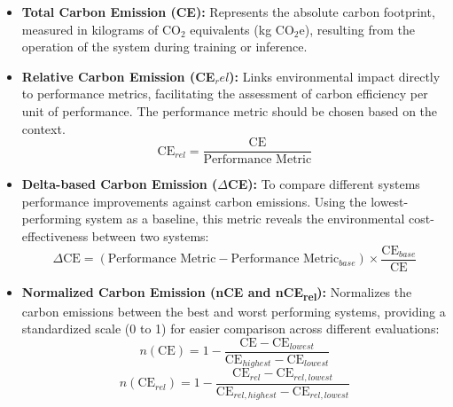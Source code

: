 \begin{itemize}
    \item \textbf{Total Carbon Emission (CE):} Represents the absolute carbon footprint, measured in kilograms of CO$_2$ equivalents (kg CO$_2$e), resulting from the operation of the system during training or inference.

    \item \textbf{Relative Carbon Emission (CE$_rel$):} Links environmental impact directly to performance metrics, facilitating the assessment of carbon efficiency per unit of performance. The performance metric should be chosen based on the context.
    \[
    \text{CE}_{rel} = \frac{\text{CE}}{\text{Performance Metric}}
    \]

    \item \textbf{Delta-based Carbon Emission ($\Delta$CE):} To compare different systems performance improvements against carbon emissions. Using the lowest-performing system as a baseline, this metric reveals the environmental cost-effectiveness between two systems:
    \[
    \Delta\text{CE} = (\text{Performance Metric} - \text{Performance Metric}_{base}) \times \frac{\text{CE}_{base}}{\text{CE}}
    \]

    \item \textbf{Normalized Carbon Emission (nCE and nCE\textsubscript{rel}):} Normalizes the carbon emissions between the best and worst performing systems, providing a standardized scale (0 to 1) for easier comparison across different evaluations:
    \[
    n(\text{CE}) = 1 - \frac{\text{CE} - \text{CE}_{lowest}}{\text{CE}_{highest} - \text{CE}_{lowest}}
    \]
    \[
    n(\text{CE}_{rel}) = 1 - \frac{\text{CE}_{rel} - \text{CE}_{rel,lowest}}{\text{CE}_{rel,highest} - \text{CE}_{rel,lowest}}
    \]
\end{itemize}









